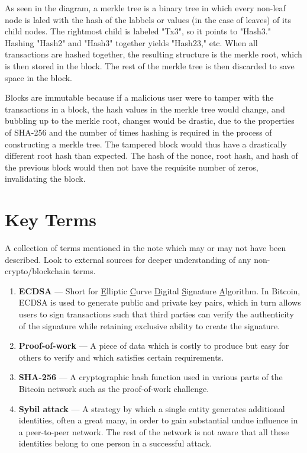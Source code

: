 \documentclass[11pt]{article}
\begin{document}
   As seen in the diagram, a merkle tree is a binary tree in which every non-leaf node is laled with the hash of the labbels or values (in the case of leaves) of its child nodes. The rightmost child is labeled "Tx3", so it points to "Hash3." Hashing "Hash2" and "Hash3" together yields "Hash23," etc. When all transactions are hashed together, the resulting structure is the merkle root, which is then stored in the block. The rest of the merkle tree is then discarded to save space in the block.
   
   Blocks are immutable because if a malicious user were to tamper with the transactions in a block, the hash values in the merkle tree would change, and bubbling up to the merkle root, changes would be drastic, due to the properties of SHA-256 and the number of times hashing is required in the process of constructing a merkle tree. The tampered block would thus have a drastically different root hash than expected. The hash of the nonce, root hash, and hash of the previous block would then not have the requisite number of zeros, invalidating the block.
   
    
    
    \newpage
    \thispagestyle{firstpage}
    \vspace*{2\baselineskip}
    \section*{Key Terms}
    \noindent A collection of terms mentioned in the note which may or may not have been described. Look to external sources for deeper understanding of any non-crypto/blockchain terms.
    \begin{enumerate}
        \item \textbf{ECDSA} --- Short for \underline{E}lliptic \underline{C}urve \underline{D}igital \underline{S}ignature \underline{A}lgorithm. In Bitcoin, ECDSA is used to generate public and private key pairs, which in turn allows users to sign transactions such that third parties can verify the authenticity of the signature while retaining exclusive ability to create the signature.
        \item \textbf{Proof-of-work} --- A piece of data which is costly to produce but easy for others to verify and which satisfies certain requirements. 
        \item \textbf{SHA-256} --- A cryptographic hash function used in various parts of the Bitcoin network such as the proof-of-work challenge.
        \item \textbf{Sybil attack} --- A strategy by which a single entity generates additional identities, often a great many, in order to gain substantial undue influence in a peer-to-peer network. The rest of the network is not aware that all these identities belong to one person in a successful attack.
    \end{enumerate}
\end{document}
